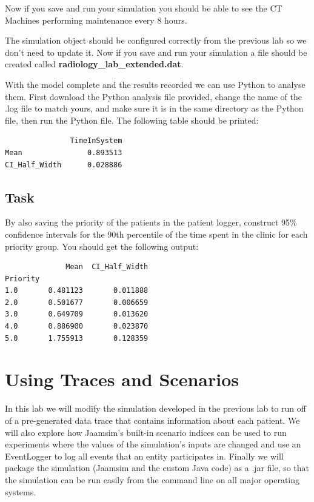 \documentclass[
  10pt,
  a4paperpaper,
  DIV=11,
  numbers=noendperiod,
  oneside]{scrreprt}
\begin{document}
Now if you save and run your simulation you should be able to see the CT
Machines performing maintenance every 8 hours.

The simulation object should be configured correctly from the previous
lab so we don't need to update it. Now if you save and run your
simulation a file should be created called
\textbf{radiology\_lab\_extended.dat}.

With the model complete and the results recorded we can use Python to
analyse them. First download the Python analysis file provided, change
the name of the .log file to match yours, and make sure it is in the
same directory as the Python file, then run the Python file. The
following table should be printed:

\begin{codeout}

\begin{verbatim}
               TimeInSystem
Mean               0.893513
CI_Half_Width      0.028886
\end{verbatim}

\end{codeout}

\section{Task}\label{task-1}

By also saving the priority of the patients in the patient logger,
construct 95\% confidence intervals for the 90th percentile of the time
spent in the clinic for each priority group. You should get the
following output:

\begin{codeout}

\begin{verbatim}
              Mean  CI_Half_Width
Priority                         
1.0       0.481123       0.011888
2.0       0.501677       0.006659
3.0       0.649709       0.013620
4.0       0.886900       0.023870
5.0       1.755913       0.128359
\end{verbatim}

\end{codeout}

\chapter{Using Traces and Scenarios}\label{using-traces-and-scenarios}

In this lab we will modify the simulation developed in the previous lab
to run off of a pre-generated data trace that contains information about
each patient. We will also explore how Jaamsim's built-in scenario
indices can be used to run experiments where the values of the
simulation's inputs are changed and use an EventLogger to log all events
that an entity participates in. Finally we will package the simulation
(Jaamsim and the custom Java code) as a .jar file, so that the
simulation can be run easily from the command line on all major
operating systems.
\end{document}
